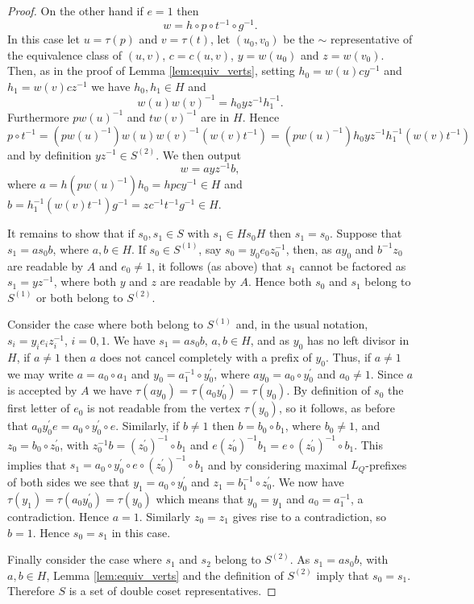 \documentclass[a4paper,12pt]{article}
\renewcommand{\t}{\tau }
\numberwithin{equation}{section}
\numberwithin{figure}{section}
\begin{document}
\begin{proof}
On the other hand if $e=1$ then
\[w=h\circ p\circ t^{-1}\circ g^{-1}.\]
In this case let $u=\t(p)$ and $v=\t(t)$,
let $(u_0,v_0)$ be the $\sim$ representative
of the equivalence class of $(u,v)$, $c=c(u,v)$,
 $y=w(u_0)$ and $z=w(v_0)$. Then,  as in the proof of Lemma
\ref{lem:equiv_verts}, setting $h_0=w(u)cy^{-1}$ and
$h_1=w(v)cz^{-1}$ we have
 $h_0,h_1\in H$ and
\[w(u)w(v)^{-1}=h_0yz^{-1}h_1^{-1}.\] Furthermore
 $p w(u)^{-1}$ and  $t w(v)^{-1}$ are in $H$. Hence
\[
p\circ t^{-1}=( p w(u)^{-1})w(u)w(v)^{-1}( w(v)t^{-1})=( p w(u)^{-1}) h_0 yz^{-1}
h_1^{-1}( w(v)t^{-1})
\]
and by definition $yz^{-1}\in S^{(2)}$. We then output
\[w=a yz^{-1} b,\]
where $a=h ( p w(u)^{-1}) h_0=hpcy^{-1}\in H$ and $b=h_1^{-1}( w(v)t^{-1})g^{-1}
=zc^{-1}t^{-1}g^{-1}\in H$.

It remains to show that if $s_0,s_1\in S$ with $s_1\in Hs_0H$
then $s_1=s_0$. Suppose that $s_1=as_0b$, where $a, b\in H$. If
$s_0\in S^{(1)}$, say $s_0=y_0e_0z_0^{-1}$, then, as $ay_0$ and
$b^{-1}z_0$ are readable by $A$ and $e_0\neq 1$, it follows (as
above) that $s_1$ cannot be factored as $s_1=yz^{-1}$, where both
$y$ and $z$ are readable by $A$. Hence both $s_0$ and $s_1$ belong
to $S^{(1)}$ or both belong to $S^{(2)}$.

Consider the case where both belong to $S^{(1)}$ and, in the usual notation,
$s_i=y_i e_i z_i^{-1}$, $i=0,1$. We have $s_1=as_0b$, $a,b\in H$, and as $y_0$ has
no left divisor in $H$, if $a\neq 1$ then $a$ does not cancel completely with
 a prefix of $y_0$. Thus, if $a\neq 1$ we may write $a=a_0\circ a_1$ and
$y_0=a_1^{-1}\circ y_0^\prime$, where $ay_0=a_0\circ y_0^\prime$
and $a_0\neq 1$. Since
$a$ is accepted by $A$ we have $\t(ay_0)=\t(a_0y_0^\prime)=\t(y_0)$. By definition
of $s_0$ the first letter of $e_0$ is not readable from the vertex $\t(y_0)$, so
it follows, as before that $a_0y_0^\prime e=a_0\circ y_0^\prime \circ e$. Similarly,
if $b\neq 1$ then $b=b_0\circ b_1$, where $b_0\neq 1$,  and $z_0=b_0\circ z_0^\prime$, with
$z_0^{-1}b= (z_0^\prime)^{-1}\circ b_1$ and $e (z_0^\prime)^{-1}b_1=
e\circ  (z_0^\prime)^{-1}\circ b_1$. This implies that
$s_1=a_0\circ y_0^\prime \circ  e\circ  (z_0^\prime)^{-1}\circ b_1$ and by considering
maximal $L_Q$-prefixes of both sides we see that $y_1=a_0\circ y_0^\prime$ and
$z_1=b_1^{-1}\circ z_0^\prime$. We now have  $\t(y_1)=\t(a_0y_0^\prime)=\t(y_0)$ which
 means that
$y_0=y_1$ and $a_0=a_1^{-1}$,  a contradiction. Hence $a=1$.
Similarly $z_0=z_1$ gives rise to  a contradiction, so $b=1$.
Hence $s_0=s_1$ in this case.

Finally consider the case where $s_1$ and $s_2$ belong to
$S^{(2)}$. As $s_1=as_0b$, with $a,b\in H$, Lemma
\ref{lem:equiv_verts} and the definition of $S^{(2)}$ imply  that
$s_0= s_1$. Therefore $S$ is a set of double coset
representatives.
\end{proof}
\end{document}
